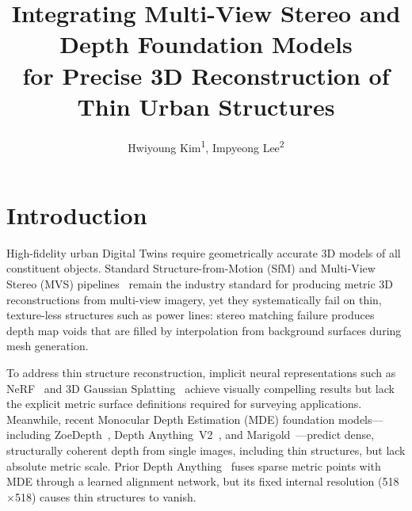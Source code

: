 \documentclass{isprs}
\begin{document}
\title{Integrating Multi-View Stereo and Depth Foundation Models\\for Precise 3D Reconstruction of Thin Urban Structures}

\author{Hwiyoung Kim\textsuperscript{1}, Impyeong Lee\textsuperscript{2}}

\address{
	\textsuperscript{1 }Geospatial Team, InnoPAM, Yongsan-gu, Seoul, Korea -- hykim@innopam.com\\
	\textsuperscript{2 }Dept.\ of Geoinformatics, University of Seoul, Dongdaemun-gu, Seoul, Korea -- iplee@uos.ac.kr\\
}

\maketitle

\sloppy

\section{Introduction}\label{sec:intro}

High-fidelity urban Digital Twins require geometrically accurate 3D models of all constituent objects. Standard Structure-from-Motion (SfM) and Multi-View Stereo (MVS) pipelines~\cite{schonberger2016sfm} remain the industry standard for producing metric 3D reconstructions from multi-view imagery, yet they systematically fail on thin, texture-less structures such as power lines: stereo matching failure produces depth map voids that are filled by interpolation from background surfaces during mesh generation.

To address thin structure reconstruction, implicit neural representations such as NeRF~\cite{mildenhall2021nerf} and 3D Gaussian Splatting~\cite{kerbl2023gaussian} achieve visually compelling results but lack the explicit metric surface definitions required for surveying applications. Meanwhile, recent Monocular Depth Estimation (MDE) foundation models---including ZoeDepth~\cite{bhat2023zoedepth}, Depth Anything~V2~\cite{yang2024dav2}, and Marigold~\cite{ke2024marigold}---predict dense, structurally coherent depth from single images, including thin structures, but lack absolute metric scale. Prior Depth Anything~\cite{wang2025priorda} fuses sparse metric points with MDE through a learned alignment network, but its fixed internal resolution (518$\times$518) causes thin structures to vanish.
\end{document}
